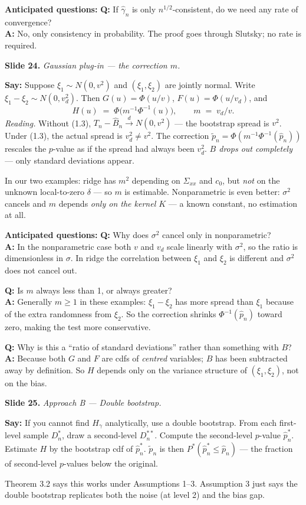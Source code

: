 \documentclass[11pt]{article}
\theoremstyle{definition}
\newcommand{\Pstar}{P^{*}}
\newcommand{\dto}{\xrightarrow{d}}
\newcommand{\Tn}{T_{n}}
\newcommand{\Bnh}{\hat{B}_{n}}
\newcommand{\pnh}{\hat{p}_{n}}
\newcommand{\pnhs}{\hat{p}_{n}^{*}}
\newcommand{\pnt}{\tilde{p}_{n}}
\newcommand{\Dns}{D_{n}^{*}}
\newcommand{\Dnss}{D_{n}^{**}}
\newcommand{\slide}[2]{%
  \medskip
  \noindent\colorbox{soft}{\parbox{\linewidth}{\textbf{Slide #1.} \textit{#2}}}
  \medskip
}
\newcommand{\say}[1]{\textbf{Say:} #1}
\newcommand{\Q}[2]{\noindent\textcolor{warn}{\textbf{Q:}} #1\\ \textcolor{accent}{\textbf{A:}} #2\par\smallskip}
\begin{document}
\textbf{Anticipated questions:}
\Q{If $\hat\gamma_n$ is only $n^{1/2}$-consistent, do we need any rate of convergence?}
{No, only consistency in probability. The proof goes through Slutsky;
no rate is required.}

\slide{24}{Gaussian plug-in --- the correction $m$.}
\say{Suppose $\xi_1\sim N(0,v^2)$ and $(\xi_1,\xi_2)$ are jointly normal. Write
$\xi_1-\xi_2\sim N(0,v_d^2)$. Then $G(u)=\Phi(u/v)$, $F(u)=\Phi(u/v_d)$, and
\[
  H(u) \;=\; \Phi\bigl(m^{-1}\Phi^{-1}(u)\bigr),
  \qquad m \;=\; v_d/v.
\]
\emph{Reading.} Without (1.3), $\Tn-\Bnh\dto N(0,v^2)$ --- the bootstrap spread
is $v^2$. Under (1.3), the actual spread is $v_d^2 \neq v^2$. The correction
$\pnt=\Phi(m^{-1}\Phi^{-1}(\pnh))$ rescales the $p$-value as if the spread had
always been $v_d^2$. \emph{$B$ drops out completely} --- only standard deviations
appear.

In our two examples: ridge has $m^2$ depending on $\Sigma_{xx}$ and $c_0$, but
\emph{not} on the unknown local-to-zero $\delta$ --- so $m$ is estimable.
Nonparametric is even better: $\sigma^2$ cancels and $m$ depends \emph{only on
the kernel $K$} --- a known constant, no estimation at all.}

\textbf{Anticipated questions:}
\Q{Why does $\sigma^2$ cancel only in nonparametric?}
{In the nonparametric case both $v$ and $v_d$ scale linearly with $\sigma^2$,
so the ratio is dimensionless in $\sigma$. In ridge the correlation between
$\xi_1$ and $\xi_2$ is different and $\sigma^2$ does not cancel out.}
\Q{Is $m$ always less than 1, or always greater?}
{Generally $m\ge 1$ in these examples: $\xi_1-\xi_2$ has more spread than
$\xi_1$ because of the extra randomness from $\xi_2$. So the correction
shrinks $\Phi^{-1}(\pnh)$ toward zero, making the test more conservative.}
\Q{Why is this a ``ratio of standard deviations'' rather than something with $B$?}
{Because both $G$ and $F$ are cdfs of \emph{centred} variables; $B$ has been
subtracted away by definition. So $H$ depends only on the variance structure
of $(\xi_1,\xi_2)$, not on the bias.}

\slide{25}{Approach B --- Double bootstrap.}
\say{If you cannot find $H_\gamma$ analytically, use a double bootstrap. From
each first-level sample $\Dns$, draw a second-level $\Dnss$. Compute the
second-level $p$-value $\pnhs$. Estimate $H$ by the bootstrap cdf of $\pnhs$.
$\pnt$ is then $\Pstar(\pnhs\le\pnh)$ --- the fraction of second-level
$p$-values below the original.

Theorem 3.2 says this works under Assumptions 1--3. Assumption 3 just says the
double bootstrap replicates both the noise (at level 2) and the bias gap.}
\end{document}
